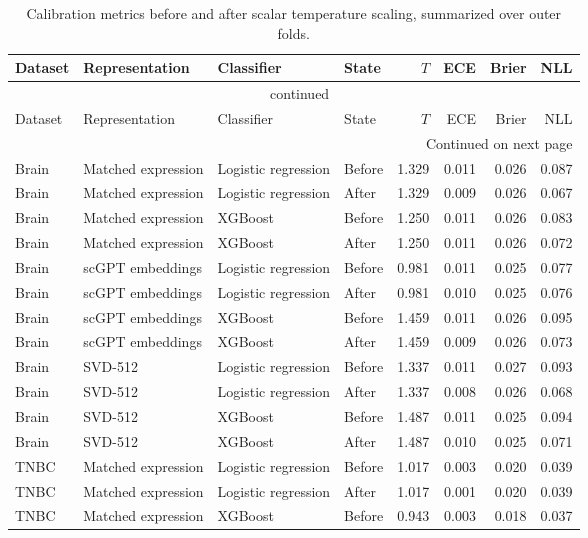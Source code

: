 {\footnotesize\setlength{\tabcolsep}{3pt}
\begin{longtable}{llllrrrr}
\caption{Calibration metrics before and after scalar temperature scaling, summarized over outer folds.}\label{tab:s-temperature}\\
\toprule
Dataset & Representation & Classifier & State & $T$ & ECE & Brier & NLL \\
\midrule
\endfirsthead
\multicolumn{8}{c}{\tablename\ \thetable{} continued}\\
\toprule
Dataset & Representation & Classifier & State & $T$ & ECE & Brier & NLL \\
\midrule
\endhead
\midrule
\multicolumn{8}{r}{Continued on next page}\\
\endfoot
\bottomrule
\endlastfoot
Brain & Matched expression & Logistic regression & Before & 1.329 & 0.011 & 0.026 & 0.087 \\
Brain & Matched expression & Logistic regression & After & 1.329 & 0.009 & 0.026 & 0.067 \\
Brain & Matched expression & XGBoost & Before & 1.250 & 0.011 & 0.026 & 0.083 \\
Brain & Matched expression & XGBoost & After & 1.250 & 0.011 & 0.026 & 0.072 \\
Brain & scGPT embeddings & Logistic regression & Before & 0.981 & 0.011 & 0.025 & 0.077 \\
Brain & scGPT embeddings & Logistic regression & After & 0.981 & 0.010 & 0.025 & 0.076 \\
Brain & scGPT embeddings & XGBoost & Before & 1.459 & 0.011 & 0.026 & 0.095 \\
Brain & scGPT embeddings & XGBoost & After & 1.459 & 0.009 & 0.026 & 0.073 \\
Brain & SVD-512 & Logistic regression & Before & 1.337 & 0.011 & 0.027 & 0.093 \\
Brain & SVD-512 & Logistic regression & After & 1.337 & 0.008 & 0.026 & 0.068 \\
Brain & SVD-512 & XGBoost & Before & 1.487 & 0.011 & 0.025 & 0.094 \\
Brain & SVD-512 & XGBoost & After & 1.487 & 0.010 & 0.025 & 0.071 \\
TNBC & Matched expression & Logistic regression & Before & 1.017 & 0.003 & 0.020 & 0.039 \\
TNBC & Matched expression & Logistic regression & After & 1.017 & 0.001 & 0.020 & 0.039 \\
TNBC & Matched expression & XGBoost & Before & 0.943 & 0.003 & 0.018 & 0.037 \\

\end{longtable}}
